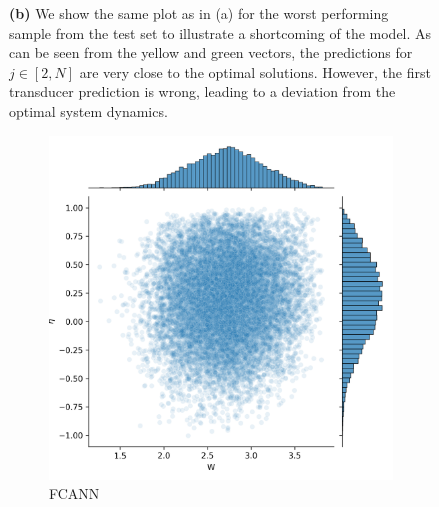 \begin{figure}
{	\textbf{(b)} We show the same plot as in (a) for the worst performing sample from the test set to illustrate a shortcoming of the model. As can be seen from the yellow and green vectors, the predictions for $j \in [2, N]$ are very close to the optimal solutions. However, the first transducer prediction is wrong, leading to a deviation from the optimal system dynamics.}
\end{figure}

\begin{figure}
	\centering
	\begin{subfigure}{0.32\textwidth}
		\centering
		\includegraphics[width=\textwidth]{img/work_dist_n5_eigen_ann}
		\caption{FCANN}
		\label{}
	\end{subfigure}
	\begin{subfigure}{0.32\textwidth}
		\centering

\end{subfigure}
\end{figure}

